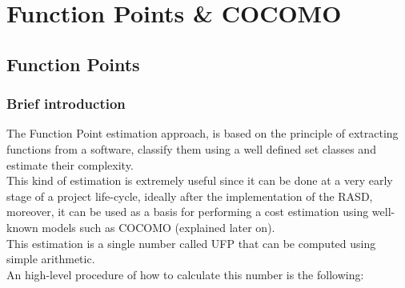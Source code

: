 \newpage
\def\arraystretch{1.15}
\section{Function Points \& COCOMO}
\subsection{Function Points}
\subsubsection{Brief introduction}
The Function Point estimation approach, is based on the principle of extracting functions from a software, classify them using a well defined set classes and estimate their complexity. \\ This kind of estimation is extremely useful since it can be done at a very early stage of a project life-cycle, ideally after the implementation of the RASD, moreover, it can be used as a basis for performing a cost estimation using well-known models such as COCOMO (explained later on). \\
This estimation is a single number called UFP that can be computed using simple arithmetic. \\
An high-level procedure of how to calculate this number is the following:
